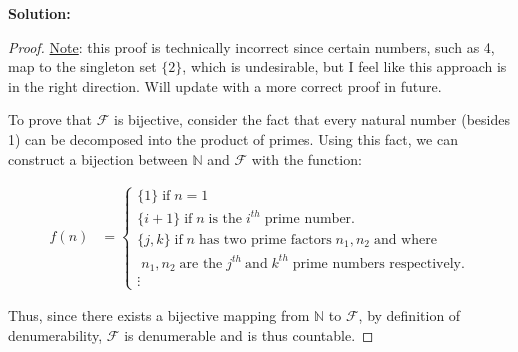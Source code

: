 \documentclass[10pt]{article}
\newenvironment{solution}{
	\vspace{1em}\par\large\textbf{{Solution:}}\par\vspace{1em}
}{
	\vspace{1em}
}
\begin{document}
\begin{solution}
	\begin{proof}
		\underline{Note}: this proof is technically incorrect since certain numbers, such as 4, map to the singleton set $\{2\}$, which is undesirable, but I feel like this approach is in the right direction. Will update with a more correct proof in future.

		To prove that $\mathcal{F}$ is bijective, consider the fact that every natural number (besides 1) can be decomposed into the product of primes. Using this fact, we can construct a bijection between $\mathbb{N}$ and $\mathcal{F}$ with the function:

		\begin{align*}
			f(n) &=
			\begin{cases}
				\{1\} \; \text{if} \; n = 1 \\
				\{i + 1\} \; \text{if} \; n \; \text{is the} \; i^{th} \; \text{prime number.} \\
				\{j, k\} \; \text{if} \; n \; \text{has two prime factors} \; n_1, n_2 \; \text{and where}\\ \; n_1, n_2 \; \text{are the} \; j^{th}\ \text{and} \; k^{th} \; \text{prime numbers respectively.} \\
				\vdots
			\end{cases}
		\end{align*}

		Thus, since there exists a bijective mapping from $\mathbb{N}$ to $\mathcal{F}$, by definition of denumerability, $\mathcal{F}$ is denumerable and is thus countable.
	\end{proof}
\end{solution}

\ifdefined\iscombined
\newpage
\else
	
\end{document}
